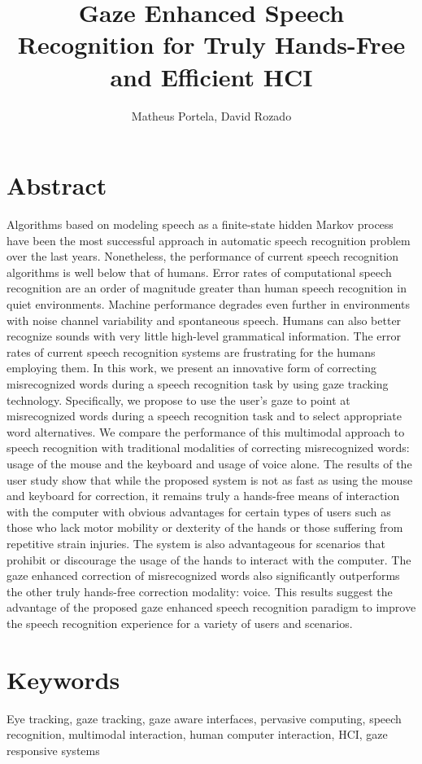 \documentclass[]{article}
\title{Gaze Enhanced Speech Recognition for Truly Hands-Free and Efficient HCI}
\author{Matheus Portela, David Rozado}
\begin{document}
\maketitle

\section{Abstract}
Algorithms based on modeling speech as a finite-state hidden Markov process have been the most successful approach in
automatic speech recognition problem over the last years. Nonetheless, the performance of current speech recognition
algorithms is well below that of humans. Error rates of computational speech recognition are an order of magnitude
greater than human speech recognition in quiet environments. Machine performance degrades even further in environments
with noise channel variability and spontaneous speech. Humans can also better recognize sounds with very little
high-level grammatical information. The error rates of current speech recognition systems are frustrating for the humans
employing them. In this work, we present an innovative form of correcting misrecognized words during a speech
recognition task by using gaze tracking technology. Specifically, we propose to use the user's gaze to point at
misrecognized words during a speech recognition task and to select appropriate word alternatives. We compare  the
performance of this multimodal approach to speech recognition with traditional modalities of correcting misrecognized
words: usage of the mouse and the keyboard and usage of voice alone. The results of the user study show that while the
proposed system is not as fast as using the mouse and keyboard for correction, it remains truly a hands-free means of interaction with
the computer with obvious advantages for certain types of users such as those who lack  motor mobility or dexterity of
the hands or those suffering from repetitive strain injuries. The system is also advantageous for scenarios that
prohibit or discourage the usage of the hands to interact with the computer. The gaze enhanced correction of
misrecognized words also significantly outperforms the other truly hands-free correction modality: voice. This results
suggest the advantage of the proposed gaze enhanced speech recognition paradigm to improve the speech recognition
experience for a variety of users and scenarios.


\section{Keywords}
Eye tracking, gaze tracking, gaze aware interfaces, pervasive computing, speech recognition, multimodal interaction,
human computer interaction, HCI, gaze responsive systems 
\end{document}
